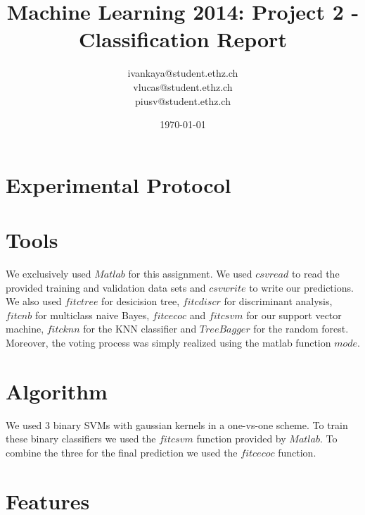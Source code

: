 \documentclass[a4paper, 11pt]{article}
\title{Machine Learning 2014: Project 2 - Classification Report}
\author{ivankaya@student.ethz.ch\\vlucas@student.ethz.ch\\piusv@student.ethz.ch\\}
\date{\today}
\begin{document}
\maketitle

\section*{Experimental Protocol}

\section{Tools}

We exclusively used $Matlab$ for this assignment.
We used $csvread$ to read the provided training and validation data sets and $csvwrite$ to write our predictions. We also used $fitctree$ for desicision tree, $fitcdiscr$ for discriminant analysis, $fitcnb$ for multiclass naive Bayes, $fitcecoc$ and $fitcsvm$ for our support vector machine, $fitcknn$ for the KNN classifier and $TreeBagger$ for the random forest. Moreover, the voting process was simply realized using the matlab function $mode$.

\section{Algorithm}

We used $3$ binary SVMs with gaussian kernels in a one-vs-one scheme. To train
these binary classifiers we used the $fitcsvm$ function provided by $Matlab$.
To combine the three for the final prediction we used the $fitcecoc$ function.

\section{Features}
\end{document}
